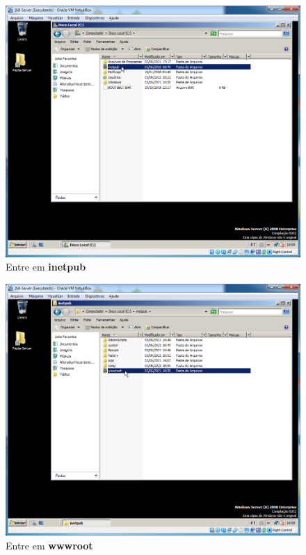\documentclass[10pt]{article}
\begin{document}
\begin{figure}[H]
    \centering
    \caption{Entre em \textbf{inetpub}}
    \label{fig:5532024}
    \includegraphics[width=\linewidth]{images/IIS/criando_um_novo_site/024.png}
\end{figure}
\begin{figure}[H]
    \centering
    \caption{Entre em \textbf{wwwroot}}
    \label{fig:5532025}
    \includegraphics[width=\linewidth]{images/IIS/criando_um_novo_site/025.png}
\end{figure}
\end{document}
